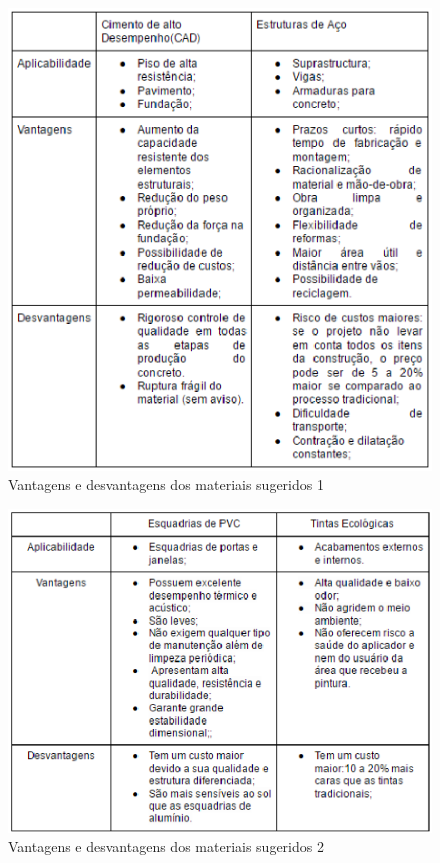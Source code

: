 \begin{figure}[!ht]
\centering
\includegraphics[keepaspectratio=true,scale=1]{figuras/vantagens_e_desvantagens_material1.eps}
\caption{ Vantagens e desvantagens dos materiais sugeridos 1}
\end{figure}

\begin{figure}[!ht]
\centering
\includegraphics[scale=1]{figuras/vantagens_e_desvantagens_do_material_2.eps}
\caption{ Vantagens e desvantagens dos materiais sugeridos 2}
\end{figure}

